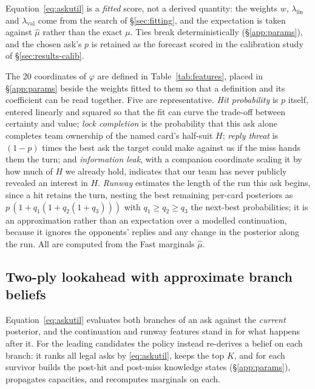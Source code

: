 \documentclass[11pt]{article}
\theoremstyle{definition}
\newcommand{\numAskFeats}{20}
\begin{document}
Equation~\eqref{eq:askutil} is a \emph{fitted} score, not a derived quantity:
the weights $w$, $\lambda_{\mathrm{lin}}$ and $\lambda_{\mathrm{val}}$ come
from the search of \S\ref{sec:fitting}, and the expectation is taken against
$\hat\mu$ rather than the exact $\mu$. Ties break deterministically
(\S\ref{app:params}), and the chosen ask's $p$ is retained as the forecast
scored in the calibration study of \S\ref{sec:results-calib}.

The \numAskFeats{} coordinates of $\varphi$ are defined in
Table~\ref{tab:features}, placed in \S\ref{app:params} beside the weights
fitted to them so that a definition and its coefficient can be read together.
Five are representative. \emph{Hit probability} is $p$ itself, entered
linearly and squared so that the fit can curve the trade-off between certainty
and value; \emph{lock completion} is the probability that this ask alone
completes team ownership of the named card's half-suit $H$; \emph{reply
threat} is $(1-p)$ times the best ask the target could make against us if the
miss hands them the turn; and \emph{information leak}, with a companion
coordinate scaling it by how much of $H$ we already hold, indicates that our
team has never publicly revealed an interest in $H$. \emph{Runway} estimates
the length of the run this ask begins, since a hit retains the turn, nesting
the best remaining per-card posteriors as $p\,(1 + q_1(1 + q_2(1 + q_3)))$
with $q_1 \ge q_2 \ge q_3$ the next-best probabilities; it is an approximation
rather than an expectation over a modelled continuation, because it ignores
the opponents' replies and any change in the posterior along the run. All are
computed from the Fast marginals $\hat\mu$.

\subsection{Two-ply lookahead with approximate branch beliefs}
\label{sec:twoply}

Equation~\eqref{eq:askutil} evaluates both branches of an ask against the
\emph{current} posterior, and the continuation and runway features stand in
for what happens after it. For the leading candidates the policy instead
re-derives a belief on each branch: it ranks all legal asks by
\eqref{eq:askutil}, keeps the top $K$, and for each survivor builds the
post-hit and post-miss knowledge states (\S\ref{app:params}), propagates
capacities, and recomputes marginals on each.
\end{document}
